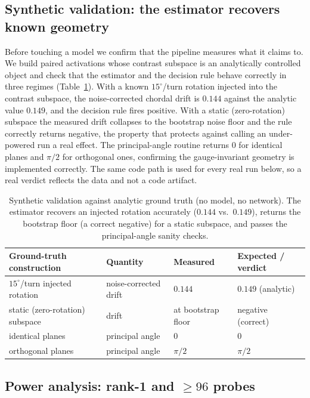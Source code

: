 \subsection{Synthetic validation: the estimator recovers known geometry}
\label{sec:res-synth}

Before touching a model we confirm that the pipeline measures what it claims to. We build
paired activations whose contrast subspace is an analytically controlled object and check
that the estimator and the decision rule behave correctly in three regimes
(Table~\ref{tab:synth}). With a known $15^\circ$/turn rotation injected into the contrast
subspace, the noise-corrected chordal drift is $0.144$ against the analytic value $0.149$, and the decision rule fires positive. With a static (zero-rotation)
subspace the measured drift collapses to the bootstrap noise floor and the rule correctly
returns negative, the property that protects against calling an under-powered run a real
effect. The principal-angle routine returns $0$ for identical planes and $\pi/2$ for
orthogonal ones, confirming the gauge-invariant geometry is implemented correctly. The same
code path is used for every real run below, so a real verdict reflects the data and not a
code artifact.

\begin{table}[t]
\centering
\small
\begin{tabular}{@{}llll@{}}
\toprule
Ground-truth construction & Quantity & Measured & Expected / verdict \\
\midrule
$15^\circ$/turn injected rotation & noise-corrected drift & $0.144$ & $0.149$ (analytic) \\
static (zero-rotation) subspace & drift & at bootstrap floor & negative (correct) \\
identical planes & principal angle & $0$ & $0$ \\
orthogonal planes & principal angle & $\pi/2$ & $\pi/2$ \\
\bottomrule
\end{tabular}
\caption{Synthetic validation against analytic ground truth (no model, no network). The
estimator recovers an injected rotation accurately ($0.144$ vs.\ $0.149$), returns the bootstrap floor (a
correct negative) for a static subspace, and passes the principal-angle sanity checks.}
\label{tab:synth}
\end{table}

\subsection{Power analysis: rank-1 and $\geq 96$ probes}
\label{sec:res-power}

